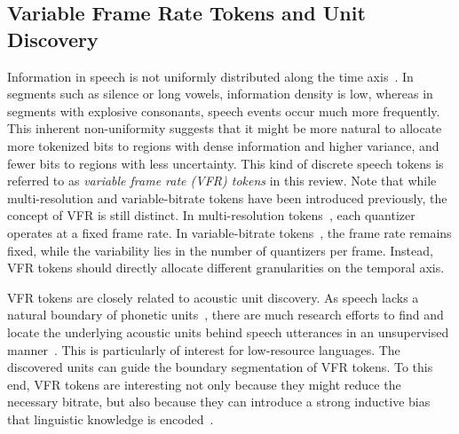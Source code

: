 \subsection{Variable Frame Rate Tokens and Unit Discovery}
\label{sec:variable-rate}
Information in speech is not uniformly distributed along the time axis~\cite{dieleman2021variable}.
In segments such as silence or long vowels, information density is low, whereas in segments with explosive consonants, speech events occur much more frequently.
This inherent non-uniformity suggests that it might be more natural to allocate more tokenized bits to regions with dense information and higher variance, and fewer bits to regions with less uncertainty.
This kind of discrete speech tokens is referred to as \textit{variable frame rate (VFR) tokens} in this review.
Note that while multi-resolution and variable-bitrate tokens have been introduced previously, the concept of VFR is still distinct.
In multi-resolution tokens~\cite{Siuzdak_SNAC_Multi-Scale_Neural_2024,guo2024speaking}, each quantizer operates at a fixed frame rate.
In variable-bitrate tokens~\cite{chae2024variable}, the frame rate remains fixed, while the variability lies in the  number of quantizers per frame.
Instead, VFR tokens should directly allocate different granularities on the temporal axis.

VFR tokens are closely related to acoustic unit discovery. As speech lacks a natural boundary of phonetic units~\cite{mohamed2022self}, there are much research efforts to find and locate the underlying acoustic units behind speech utterances in an unsupervised manner~\cite{eloff19_interspeech,dunbar20_interspeech,niekerk20b_interspeech,nguyen2020zero}.
This is particularly of interest for low-resource languages.
The discovered units can guide the boundary segmentation of VFR tokens.
To this end, VFR tokens are interesting not only because they might reduce the necessary bitrate, but also because they can introduce a strong inductive bias that linguistic knowledge is encoded~\cite{dieleman2021variable}.

